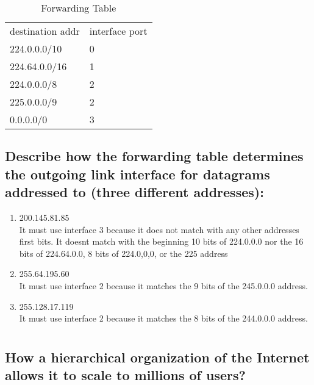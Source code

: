 \documentclass[10pt,letterpaper]{article}
\begin{document}
\begin{table}[h]
\centering
\caption{Forwarding Table}
\label{my-label}
\begin{tabular}{ll}
destination addr & interface port \\
224.0.0.0/10     & 0              \\
224.64.0.0/16    & 1              \\
224.0.0.0/8      & 2              \\
225.0.0.0/9      & 2              \\
0.0.0.0/0        & 3             
\end{tabular}
\end{table}

\subsection{Describe how the forwarding table determines the outgoing link interface for datagrams addressed to (three different addresses):}
\begin{enumerate}
  \item 200.145.81.85\\
  		It must use interface 3 because it does not match with any other addresses first bits. It doesnt match with the beginning 10 bits of 224.0.0.0 nor the 16 bits of 224.64.0.0, 8 bits of 224.0,0,0, or the 225 address
  		
  		
  \item 255.64.195.60\\
		It must use interface 2 because it matches the 9 bits of the 245.0.0.0 address.  
  
  \item 255.128.17.119\\
  		It must use interface 2 because it matches the 8 bits of the 244.0.0.0 address.
\end{enumerate}

\section{}
\subsection{How a hierarchical organization of the Internet allows it to scale to millions of users?}
\end{document}
